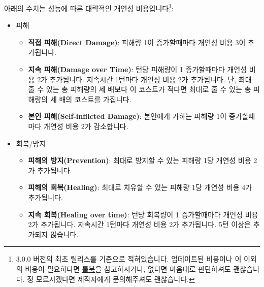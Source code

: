 \documentclass{report}
\begin{document}
	아래의 수치는 성능에 따른 대략적인 개연성 비용입니다\ifprintout\footnote{3.0.0 버전의 최초 릴리스를 기준으로 적혀있습니다. 업데이트된 비용이나 이 이외의 비용이 필요하다면 \href{https://git.io/fjphB}{룰북}을 참고하시거나, 없다면 마음대로 판단하셔도 괜찮습니다. 정 모르시겠다면 제작자에게 문의해주셔도 괜찮습니다.}\fi:
	\begin{itemize}
		\item 피해
		\begin{itemize}
			\item \textbf{직접 피해(Direct Damage)}: 피해량 1이 증가할때마다 개연성 비용 3이 추가됩니다.
			\item \textbf{지속 피해(Damage over Time)}: 턴당 피해량이 1 증가할때마다 개연성 비용 2가 추가됩니다. 지속시간 1턴마다 개연성 비용 2가 추가됩니다. 단, 최대 줄 수 있는 총 피해량의 세 배보다 이 코스트가 적다면 최대로 줄 수 있는 총 피해량의 세 배의 코스트를 가집니다.
			\item \textbf{본인 피해(Self-inflicted Damage)}: 본인에게 가하는 피해량 1이 증가할때마다 개연성 비용 2가 감소합니다.
		\end{itemize}
		
		\item 회복/방지
		\begin{itemize}
			\item \textbf{피해의 방지(Prevention)}: 최대로 방지할 수 있는 피해량 1당 개연성 비용 2가 추가됩니다.
			\item \textbf{피해의 회복(Healing)}: 최대로 치유할 수 있는 피해량 1당 개연성 비용 4가 추가됩니다.
			\item \textbf{지속 회복(Healing over time)}: 턴당 회복량이 1 증가할때마다 개연성 비용 2가 추가됩니다. 지속시간 1턴마다 개연성 비용 2가 추가됩니다. 5턴 이상은 추가되지 않습니다.
		\end{itemize}
		

\end{itemize}
\end{document}
